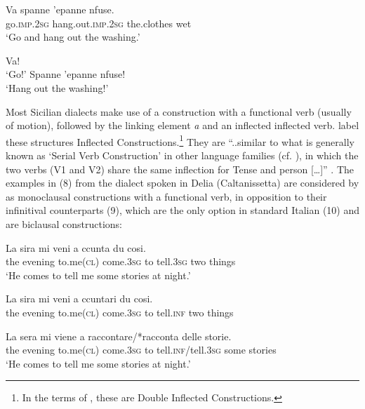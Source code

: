 \documentclass[output=paper]{langsci/langscibook}
\begin{document}
\ea%
    \label{ex:lorusso:6}
    \gll Va     spanne     'epanne  nfuse.\\
         go.\textsc{imp.2sg} hang.out.\textsc{imp.2sg}  the.clothes  wet\\
    \glt ‘Go and hang out the washing.’ \citep[230]{Ledgeway1997}
    \z

\ea%
    \label{ex:lorusso:7}
    \ea   Va!\\
    \glt  ‘Go!’
    \ex   Spanne 'epanne nfuse!\\
    \glt  ‘Hang out the washing!’ \citep[231]{Ledgeway1997}
    \z
\z

Most Sicilian dialects make use of a construction with a functional verb (usually of motion), followed by the linking element \textit{a} and an inflected inflected verb. \citet{Cardinaletti2001,Cardinaletti2003} label these structures Inflected Constructions.\footnote{In the terms of \citet{Cruschina2013}, these are Double Inflected Constructions.} They are “..similar to what is generally known as ‘Serial Verb Construction’ in other language families (cf. \citealt{Aikhenvald2006}), in which the two verbs (V1 and V2) share the same inflection for Tense and person […]” \citep[392]{Caro2015}. The examples in (8) from the dialect spoken in Delia (Caltanissetta) are considered by \citet{DiCaro2015} as monoclausal constructions with a functional verb, in opposition to their infinitival counterparts (9), which are the only option in standard Italian (10) and are biclausal constructions:

\ea%
    \label{ex:lorusso:8}
    \gll La  sira    mi    veni    a  ccunta    du   cosi.\\
         the  evening  to.me\textsc{(cl)}  come.\textsc{3sg}  to tell.\textsc{3sg} two  things\\
    \glt ‘He comes to tell me some stories at night.’
    \z


\ea%
    \label{ex:lorusso:9}
    \gll La  sira    mi    veni     a  ccuntari  du   cosi. \\
         the  evening  to.me\textsc{(cl)}  come.\textsc{3sg}  to  tell.\textsc{inf} two  things\\
    \z



\ea%
    \label{ex:lorusso:10}
    \gll La  sera    mi    viene     a   raccontare/*racconta  delle  storie.\\
         the  evening  to.me\textsc{(cl)} come.\textsc{3sg}  to  tell.\textsc{inf}/tell.\textsc{3sg}  some  stories\\
    \glt ‘He comes to tell me some stories at night.’ \citep{DiCaro2015}
    \z
\end{document}
